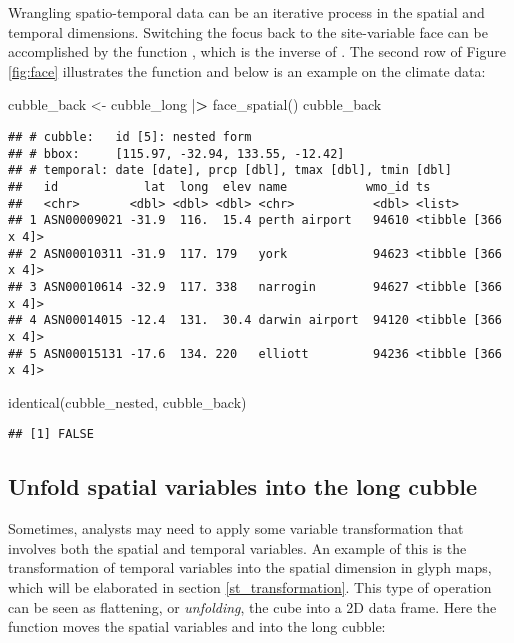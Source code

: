 \documentclass{article}
\newenvironment{Shaded}{\begin{snugshade}}{\end{snugshade}}
\newcommand{\ErrorTok}[1]{\textcolor[rgb]{0.64,0.00,0.00}{\textbf{#1}}}
\newcommand{\FunctionTok}[1]{\textcolor[rgb]{0.00,0.00,0.00}{#1}}
\newcommand{\NormalTok}[1]{#1}
\newcommand{\OtherTok}[1]{\textcolor[rgb]{0.56,0.35,0.01}{#1}}
\newcommand{\SpecialCharTok}[1]{\textcolor[rgb]{0.00,0.00,0.00}{#1}}
\begin{document}
Wrangling spatio-temporal data can be an iterative process in the spatial and temporal dimensions. Switching the focus back to the site-variable face can be accomplished by the function , which is the inverse of . The second row of Figure \ref{fig:face} illustrates the function and below is an example on the climate data:

\begin{Shaded}
\begin{Highlighting}[]
\NormalTok{cubble\_back }\OtherTok{\textless{}{-}}\NormalTok{ cubble\_long }\SpecialCharTok{|}\ErrorTok{\textgreater{}} \FunctionTok{face\_spatial}\NormalTok{()}
\NormalTok{cubble\_back}
\end{Highlighting}
\end{Shaded}

\begin{verbatim}
## # cubble:   id [5]: nested form
## # bbox:     [115.97, -32.94, 133.55, -12.42]
## # temporal: date [date], prcp [dbl], tmax [dbl], tmin [dbl]
##   id            lat  long  elev name           wmo_id ts                
##   <chr>       <dbl> <dbl> <dbl> <chr>           <dbl> <list>            
## 1 ASN00009021 -31.9  116.  15.4 perth airport   94610 <tibble [366 x 4]>
## 2 ASN00010311 -31.9  117. 179   york            94623 <tibble [366 x 4]>
## 3 ASN00010614 -32.9  117. 338   narrogin        94627 <tibble [366 x 4]>
## 4 ASN00014015 -12.4  131.  30.4 darwin airport  94120 <tibble [366 x 4]>
## 5 ASN00015131 -17.6  134. 220   elliott         94236 <tibble [366 x 4]>
\end{verbatim}

\begin{Shaded}
\begin{Highlighting}[]
\FunctionTok{identical}\NormalTok{(cubble\_nested, cubble\_back)}
\end{Highlighting}
\end{Shaded}

\begin{verbatim}
## [1] FALSE
\end{verbatim}

\hypertarget{unfold}{%
\subsection{Unfold spatial variables into the long cubble}\label{unfold}}

Sometimes, analysts may need to apply some variable transformation that involves both the spatial and temporal variables. An example of this is the transformation of temporal variables into the spatial dimension in glyph maps, which will be elaborated in section \ref{st_transformation}. This type of operation can be seen as flattening, or \emph{unfolding}, the cube into a 2D data frame. Here the function  moves the spatial variables  and  into the long cubble:
\end{document}
